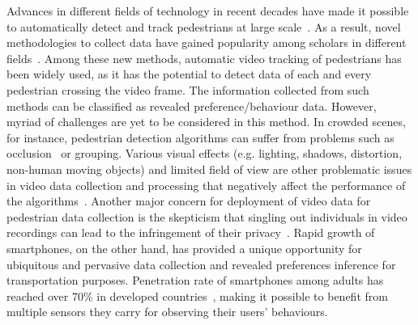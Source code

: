 Advances in different fields of technology in recent decades have made it possible to automatically detect and track pedestrians at large scale~\cite{bauer2009measurement}. As a result, novel methodologies to collect data have gained popularity among scholars in different fields~\cite{farooq2015ubiquitous}. Among these new methods, automatic video tracking of pedestrians has been widely used, as it has the potential to detect data of each and every pedestrian crossing the video frame. The information collected from such methods can be classified as revealed preference/behaviour data. However, myriad of challenges are yet to be considered in this method. In crowded scenes, for instance, pedestrian detection algorithms can suffer from problems such as occlusion~\cite{wu2005detection} or grouping. Various visual effects (e.g. lighting, shadows, distortion, non-human moving objects) and limited field of view are other problematic issues in video data collection and processing that negatively affect the performance of the algorithms~\cite{ettehadieh2014automated}. Another major concern for deployment of video data for pedestrian data collection is the skepticism that singling out individuals in video recordings can lead to the infringement of their privacy~\cite{chan2008privacy}.
Rapid growth of smartphones, on the other hand, has provided a unique opportunity for ubiquitous and pervasive data collection and revealed preferences inference for transportation purposes. Penetration rate of smartphones among adults has reached over 70\% in developed countries~\cite{pen}, making it possible to benefit from multiple sensors they carry for observing their users' behaviours. 


